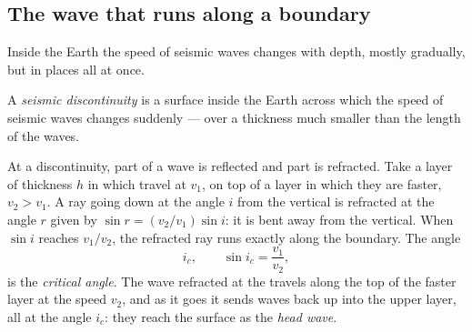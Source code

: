 \subsection{The wave that runs along a boundary}

Inside the Earth the speed of seismic waves changes with depth, mostly
gradually, but in places all at once.

\begin{definition}\label{def:g11:seismic-structure:discontinuity}
A \emph{seismic discontinuity} is a surface
inside the Earth across which the speed of seismic waves changes
suddenly --- over a thickness much smaller than the length of the waves.
\end{definition}

At a discontinuity, part of a wave is reflected and part is refracted. Take
a layer of thickness $h$ in which  travel at $v_1$, on top of a layer
in which they are faster, $v_2 > v_1$. A ray going down at the angle $i$ from
the vertical is refracted at the angle $r$ given by $\sin r = (v_2/v_1)\sin
i$: it is bent away from the vertical. When $\sin i$ reaches $v_1/v_2$, the
refracted ray runs exactly along the boundary. The angle
\[
  i_c, \qquad \sin i_c = \frac{v_1}{v_2},
\]
is the \emph{critical angle}. The wave refracted at the
 travels along the top of the faster layer at the speed $v_2$,
and as it goes it sends waves back up into the upper layer, all at the angle
$i_c$: they reach the surface as the \emph{head wave}.

